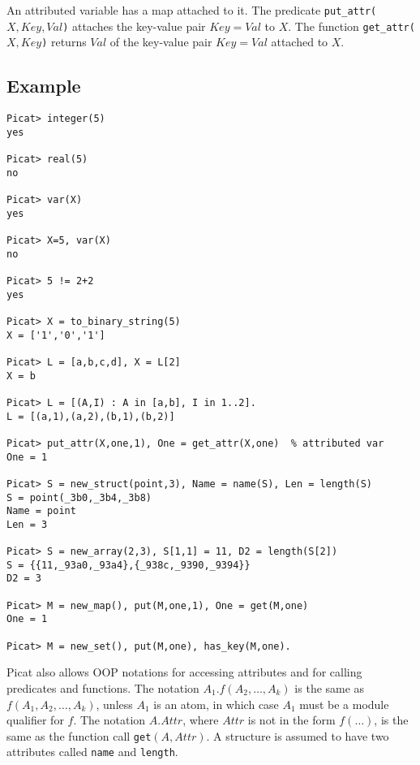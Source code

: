 An attributed variable has a map attached to it. The predicate \texttt{put\_attr($X,Key,Val$)} attaches the key-value pair \texttt{$Key$$=$$Val$} to \texttt{$X$}. The function \texttt{get\_attr($X,Key$)} returns \texttt{$Val$} of the key-value pair \texttt{$Key$$=$$Val$} attached to \texttt{$X$}. 

\subsection*{Example}
\begin{verbatim}
Picat> integer(5)
yes

Picat> real(5)
no

Picat> var(X)
yes

Picat> X=5, var(X)
no

Picat> 5 != 2+2
yes

Picat> X = to_binary_string(5)
X = ['1','0','1']

Picat> L = [a,b,c,d], X = L[2]
X = b

Picat> L = [(A,I) : A in [a,b], I in 1..2].
L = [(a,1),(a,2),(b,1),(b,2)]

Picat> put_attr(X,one,1), One = get_attr(X,one)  % attributed var
One = 1

Picat> S = new_struct(point,3), Name = name(S), Len = length(S)
S = point(_3b0,_3b4,_3b8)
Name = point
Len = 3

Picat> S = new_array(2,3), S[1,1] = 11, D2 = length(S[2])
S = {{11,_93a0,_93a4},{_938c,_9390,_9394}}
D2 = 3

Picat> M = new_map(), put(M,one,1), One = get(M,one)
One = 1

Picat> M = new_set(), put(M,one), has_key(M,one).
\end{verbatim}

Picat also allows OOP notations for accessing attributes and for calling predicates and functions. The notation \texttt{$A_1.f(A_2,\ldots,A_k)$} is the same as \texttt{$f(A_1,A_2,\ldots,A_k)$}, unless $A_1$ is an atom, in which case $A_1$ must be a module qualifier for $f$.  The notation $A.Attr$, where $Attr$ is not in the form $f(\ldots)$, is the same as the function call \texttt{get$(A,Attr)$}. A structure is assumed to have two attributes called \texttt{name} and \texttt{length}.

